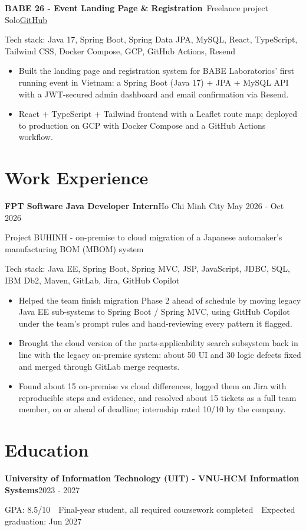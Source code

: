 \documentclass[10pt, a4paper]{article}
\newcommand{\entry}[2]{\textbf{#1}\hfill#2\par}
\newcommand{\subentry}[2]{{\color{MutedText}#1}\hfill{\color{MutedText}#2}\par}
\newcommand{\project}[3]{\textbf{#1}\,{\color{MutedText}\textbar{} #2}\hfill\href{#3}{GitHub}\par}
\newcommand{\techstack}[1]{{\color{MutedText}Tech stack: #1}\par}
\begin{document}
\vspace{2pt}
\project{BABE 26 - Event Landing Page \& Registration}{Freelance project \textbullet{} Solo}{https://github.com/minhphuong150505/landing-page}
\techstack{Java 17, Spring Boot, Spring Data JPA, MySQL, React, TypeScript, Tailwind CSS, Docker Compose, GCP, GitHub Actions, Resend}
\begin{itemize}
  \item Built the landing page and registration system for BABE Laboratorios' first running event in Vietnam: a Spring Boot (Java 17) + JPA + MySQL API with a JWT-secured admin dashboard and email confirmation via Resend.
  \item React + TypeScript + Tailwind frontend with a Leaflet route map; deployed to production on GCP with Docker Compose and a GitHub Actions workflow.
\end{itemize}

\section{Work Experience}
\entry{FPT Software \textbar{} Java Developer Intern}{Ho Chi Minh City \textbar{} May 2026 - Oct 2026}
\subentry{Project BUHINH - on-premise to cloud migration of a Japanese automaker's manufacturing BOM (MBOM) system}{}
\techstack{Java EE, Spring Boot, Spring MVC, JSP, JavaScript, JDBC, SQL, IBM Db2, Maven, GitLab, Jira, GitHub Copilot}
\begin{itemize}
  \item Helped the team finish migration Phase 2 ahead of schedule by moving legacy Java EE sub-systems to Spring Boot / Spring MVC, using GitHub Copilot under the team's prompt rules and hand-reviewing every pattern it flagged.
  \item Brought the cloud version of the parts-applicability search subsystem back in line with the legacy on-premise system: about 50 UI and 30 logic defects fixed and merged through GitLab merge requests.
  \item Found about 15 on-premise vs cloud differences, logged them on Jira with reproducible steps and evidence, and resolved about 15 tickets as a full team member, on or ahead of deadline; internship rated 10/10 by the company.
\end{itemize}

\section{Education}
\entry{University of Information Technology (UIT) - VNU-HCM \textbar{} Information Systems}{2023 - 2027}
GPA: 8.5/10 \,\textbar\, Final-year student, all required coursework completed \,\textbar\, Expected graduation: Jun 2027\par
\end{document}
